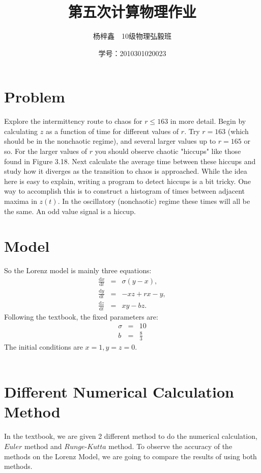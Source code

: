 \documentclass{article}
\author{杨梓鑫\ \ 10级物理弘毅班}
\title{第五次计算物理作业}
\date{学号：2010301020023}
\newcommand{\ud}{\mathrm{d}}
\begin{document}
	\maketitle
\section{Problem}
 \quad{} Explore the intermittency route to chaos for $r \leq 163$ in more detail. Begin by calculating $z$ as a function of time for different values of $r$. Try $r=163$ (which should be in the nonchaotic regime), and several larger  values up to $r=165$ or so. For the larger values of $r$ you should observe chaotic "hiccups" like those found in Figure 3.18. Next calculate the average time between these hiccups and study how it diverges as the transition to chaos is approached. While the idea here is easy to explain, writing a program to detect hiccups is a bit tricky. One way to accomplish this is to construct a histogram of times  between adjacent maxima in $z(t)$. In the oscillatory (nonchaotic) regime these times will all be the same. An odd value signal is a hiccup.\\

\section{Model}
\quad So the Lorenz model is mainly three equations:
\begin{eqnarray*}
\frac{\ud x}{\ud t} &=& \sigma (y-x),\\
\frac{\ud y}{\ud t} &=& -xz+rx-y,\\
\frac{\ud z}{\ud t} &=& xy-bz.
\end{eqnarray*}
\quad Following the textbook, the fixed parameters are:
\begin{eqnarray*}
\sigma &=& 10\\
b &=& \frac{8}{3}
\end{eqnarray*}
The initial conditions are $x=1, y=z=0$.\\\\

\section{Different Numerical Calculation Method}
\quad In the textbook, we are given 2 different method to do the numerical calculation, $Euler$ method and $Runge$-$Kutta$ method. To observe the accuracy of the methods on the Lorenz Model, we are going to compare the results of using both methods. \\\\
\end{document}
